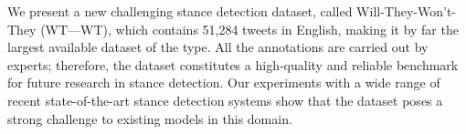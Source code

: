 We present a new challenging stance detection dataset, called Will-They-Won't-They (WT---WT), which contains 51,284 tweets in English, making it by far the largest available dataset of the type. All the annotations are carried out by experts; therefore, the dataset constitutes a high-quality and reliable benchmark for future research in stance detection. Our experiments with a wide range of recent state-of-the-art stance detection systems show that the dataset poses a strong challenge to existing models in this domain.
